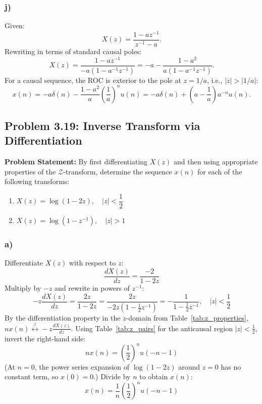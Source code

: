\documentclass[12pt,a4paper]{article}
\begin{document}
\subsubsection*{j)}
Given:
\begin{equation}
    X(z) = \frac{1 - a z^{-1}}{z^{-1} - a}.
\end{equation}
Rewriting in terms of standard causal poles:
\begin{equation}
    X(z) = \frac{1 - a z^{-1}}{-a (1 - a^{-1} z^{-1})} = -a - \frac{1 - a^2}{a (1 - a^{-1} z^{-1})}.
\end{equation}
For a causal sequence, the ROC is exterior to the pole at $z = 1/a$, i.e., $|z| > |1/a|$:
\begin{equation}
    x(n) = -a \delta(n) - \frac{1 - a^2}{a} \left(\frac{1}{a}\right)^n u(n) = -a \delta(n) + \left(a - \frac{1}{a}\right) a^{-n} u(n).
\end{equation}

\subsection{Problem 3.19: Inverse Transform via Differentiation}
\textbf{Problem Statement:} By first differentiating $X(z)$ and then using appropriate properties of the $\mathcal{Z}$-transform, determine the sequence $x(n)$ for each of the following transforms:
\begin{enumerate}[label=(\alph*)]
    \item $X(z) = \log(1 - 2z), \quad |z| < \dfrac{1}{2}$
    \item $X(z) = \log(1 - z^{-1}), \quad |z| > 1$
\end{enumerate}

\subsubsection*{a)}
Differentiate $X(z)$ with respect to $z$:
\[
\frac{dX(z)}{dz} = \frac{-2}{1 - 2z}
\]
Multiply by $-z$ and rewrite in powers of $z^{-1}$:
\[
-z\frac{dX(z)}{dz} = \frac{2z}{1 - 2z} = \frac{2z}{-2z\left(1 - \frac{1}{2}z^{-1}\right)} = -\frac{1}{1 - \frac{1}{2}z^{-1}}, \quad |z| < \frac{1}{2}
\]
By the differentiation property in the $z$-domain from Table~\ref{tab:z_properties}, $nx(n) \stackrel{z}{\longleftrightarrow} -z\frac{dX(z)}{dz}$. Using Table~\ref{tab:z_pairs} for the anticausal region $|z| < \frac{1}{2}$, invert the right-hand side:
\[
nx(n) = \left(\frac{1}{2}\right)^n u(-n - 1)
\]
(At $n = 0$, the power series expansion of $\log(1 - 2z)$ around $z = 0$ has no constant term, so $x(0) = 0$.) Divide by $n$ to obtain $x(n)$:
\[
x(n) = \frac{1}{n}\left(\frac{1}{2}\right)^n u(-n - 1)
\]
\end{document}
